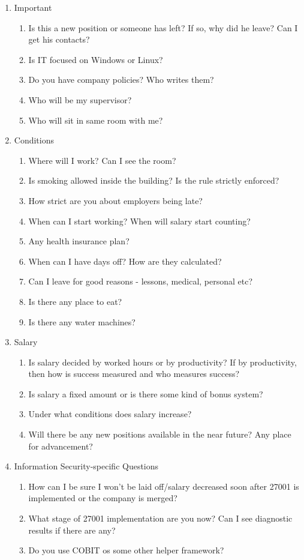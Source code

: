 \documentclass{article}
\begin{document}
\begin{enumerate}
\item Important
	\begin{enumerate}
		\item Is this a new position or someone has left? If so, why did he leave? Can I get his contacts?
		\item Is IT focused on Windows or Linux?
		\item Do you have company policies? Who writes them?
		\item Who will be my supervisor?
		\item Who will sit in same room with me?
	\end{enumerate}

\item Conditions
	\begin{enumerate}
		\item Where will I work? Can I see the room?
		\item Is smoking allowed inside the building? Is the rule strictly enforced?
		\item How strict are you about employers being late?
		\item When can I start working? When will salary start counting?
		\item Any health insurance plan?
		\item When can I have days off? How are they calculated?
		\item Can I leave for good reasons - lessons, medical, personal etc?
		\item Is there any place to eat?
		\item Is there any water machines?
	\end{enumerate}

\item Salary
	\begin{enumerate}
		\item Is salary decided by worked hours or by productivity? If by productivity, then how is success measured and who measures success?
		\item Is salary a fixed amount or is there some kind of bonus system?
		\item Under what conditions does salary increase?
		\item Will there be any new positions available in the near future? Any place for advancement?
	\end{enumerate}

\item Information Security-specific Questions
	\begin{enumerate}
		\item How can I be sure I won't be laid off/salary decreased soon after 27001 is implemented or the company is merged?
		\item What stage of 27001 implementation are you now? Can I see diagnostic results if there are any?
		\item Do you use COBIT os some other helper framework?
	\end{enumerate}
\end{enumerate}
\end{document}
